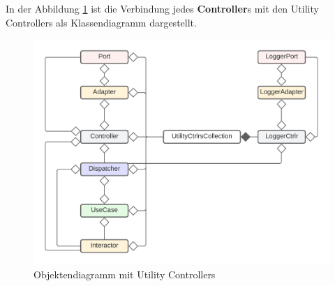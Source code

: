 In der Abbildung \ref{fig:CDControllerWithUtility} ist die Verbindung jedes \textbf{Controller}s mit den Utility Controllers als Klassendiagramm dargestellt.
    
\begin{figure}[H]
    \centering
    \includegraphics[width=12cm]{./images/KlassendiagramMitUtilityControllers.png}
     \caption[Objektendiagramm mit Utility Controllers]{Objektendiagramm mit Utility Controllers}
     \label{fig:CDControllerWithUtility}
\end{figure}
